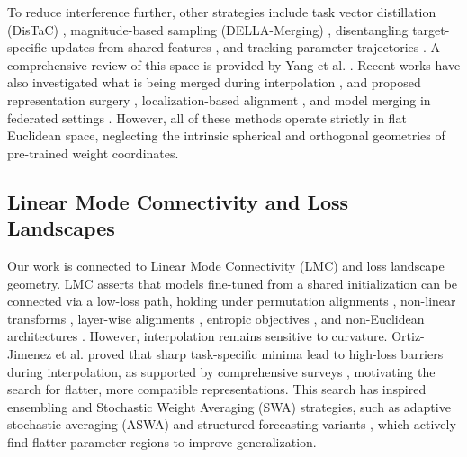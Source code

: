 \documentclass{article}
\theoremstyle{plain}
\theoremstyle{definition}
\theoremstyle{remark}
\begin{document}
To reduce interference further, other strategies include task vector distillation (DisTaC) \cite{yoshida2025distac}, magnitude-based sampling (DELLA-Merging) \cite{pala2024dellamerging}, disentangling target-specific updates from shared features \cite{ramesh2026resolving}, and tracking parameter trajectories \cite{cheng2025whoever}. A comprehensive review of this space is provided by Yang et al. \cite{yang2024model}. Recent works have also investigated what is being merged during interpolation \cite{yadav2024what}, and proposed representation surgery \cite{yang2024representation, wei2025representation, yang2024surgeryv}, localization-based alignment \cite{he2024localizeandstitch, chen2024local}, and model merging in federated settings \cite{chen2025fedmerge}. However, all of these methods operate strictly in flat Euclidean space, neglecting the intrinsic spherical and orthogonal geometries of pre-trained weight coordinates.

\subsection{Linear Mode Connectivity and Loss Landscapes}
Our work is connected to Linear Mode Connectivity (LMC) and loss landscape geometry. LMC asserts that models fine-tuned from a shared initialization can be connected via a low-loss path, holding under permutation alignments \cite{ainsworth2022rebasin, zhao2020bridging}, non-linear transforms \cite{ferbach2023proving}, layer-wise alignments \cite{adilova2023layerwise}, entropic objectives \cite{carlo2025entropic}, and non-Euclidean architectures \cite{li2025unveiling}. However, interpolation remains sensitive to curvature. Ortiz-Jimenez et al. \cite{ortiz2023task} proved that sharp task-specific minima lead to high-loss barriers during interpolation, as supported by comprehensive surveys \cite{khan2024sok}, motivating the search for flatter, more compatible representations. This search has inspired ensembling \cite{premchandar2022unified} and Stochastic Weight Averaging (SWA) strategies, such as adaptive stochastic averaging (ASWA) \cite{demir2024adaptive} and structured forecasting variants \cite{zhu2024shortterm}, which actively find flatter parameter regions to improve generalization.
\end{document}

